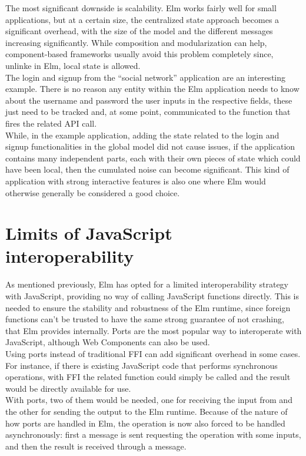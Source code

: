 The most significant downside is scalability. Elm works fairly well for small applications, but at a certain size, the centralized state approach becomes a significant overhead, with the size of the model and the different messages increasing significantly. While composition and modularization can help, component-based frameworks usually avoid this problem completely since, unlinke in Elm, local state is allowed.\\

The login and signup from the  ``social network'' application are an interesting example. There is no reason any entity within the Elm application needs to know about the username and password the user inputs in the respective fields, these just need to be tracked and, at some point, communicated to the function that fires the related API call.\\

While, in the example application, adding the state related to the login and signup functionalities in the global model did not cause issues, if the application contains many independent parts, each with their own pieces of state which could have been local, then the cumulated noise can become significant. This kind of application with strong interactive features is also one where Elm would otherwise generally be considered a good choice.

\section{Limits of JavaScript interoperability}

As mentioned previously, Elm has opted for a limited interoperability strategy with JavaScript, providing no way of calling JavaScript functions directly. This is needed to ensure the stability and robustness of the Elm runtime, since foreign functions can't be trusted to have the same strong guarantee of not crashing, that Elm provides internally. Ports are the most popular way to interoperate with JavaScript, although Web Components can also be used.\\

Using ports instead of traditional FFI can add significant overhead in some cases. For instance, if there is existing JavaScript code that performs synchronous operations, with FFI the related function could simply be called and the result would be directly available for use.\\
With ports, two of them would be needed, one for receiving the input from and the other for sending the output to the Elm runtime. Because of the nature of how ports are handled in Elm, the operation is now also forced to be handled asynchronously: first a message is sent requesting the operation with some inputs, and then the result is received through a message.\\

